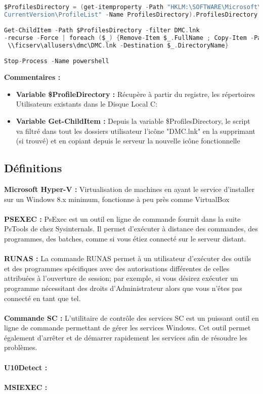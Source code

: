 \documentclass[11pt,a4paper,oneside]{article}
\begin{document}
\begin{lstlisting}[language=C]

$ProfilesDirectory = (get-itemproperty -Path "HKLM:\SOFTWARE\Microsoft\Windows NT\
CurrentVersion\ProfileList" -Name ProfilesDirectory).ProfilesDirectory

Get-ChildItem -Path $ProfilesDirectory -filter DMC.lnk 
-recurse -Force | foreach ($_) {Remove-Item $_.FullName ; Copy-Item -Path
 \\ficserv\allusers\dmc\DMC.lnk -Destination $_.DirectoryName}

Stop-Process -Name powershell

\end{lstlisting}
\textbf{Commentaires :}\\
\begin{itemize}
\item \textbf{Variable \$ProfileDirectory :} Récupère à partir du registre, les répertoires Utilisateurs existants dans le Disque Local C: 
\item \textbf{Variable Get-ChildItem :} Depuis la variable \$ProfilesDirectory, le script va filtré dans tout les dossiers utilisateur l'icône "DMC.lnk" en la supprimant (si trouvé) et en copiant depuis le serveur la nouvelle icône fonctionnelle 
\end{itemize}

\subsection{Définitions}
\textbf{Microsoft Hyper-V :} Virtualisation de machines en ayant le service d'installer sur un Windows 8.x minimum, fonctionne à peu près comme VirtualBox
\\ \\
\textbf{PSEXEC :} PsExec est un outil en ligne de commande fournit dans la suite PsTools de chez Sysinternals. Il permet d’exécuter à distance des commandes, des programmes, des batches, comme si vous étiez connecté sur le serveur distant.
\\ \\
\textbf{RUNAS :} La commande RUNAS permet à un utilisateur d'exécuter des outils et des programmes spécifiques avec des autorisations différentes de celles attribuées à l'ouverture de session; par exemple, si vous désirez exécuter un programme nécessitant des droits d'Administrateur alors que vous n'êtes pas connecté en tant que tel.
\\ \\
\textbf{Commande SC :} L'utilitaire de contrôle des services SC est un puissant outil en ligne de commande permettant de gérer les services Windows. Cet outil permet également d'arrêter et de démarrer rapidement les services afin de résoudre les problèmes.
\\ \\
\textbf{U10Detect :}
\\ \\
\textbf{MSIEXEC :}
\newpage
\end{document}
